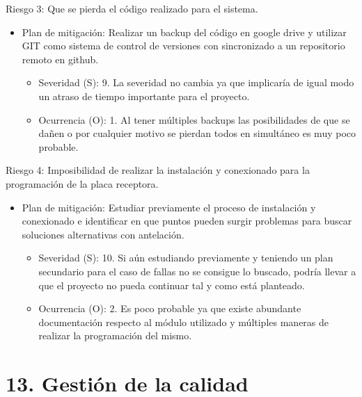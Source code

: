 \documentclass[11pt]{charter}
\begin{document}
Riesgo 3: Que se pierda el código realizado para el sistema.
\begin{itemize}
\item Plan de mitigación: Realizar un backup del código en google drive y utilizar GIT como sistema de control de versiones con sincronizado a un repositorio remoto en github.
	\begin{itemize}
	\item Severidad (S): 9. La severidad no cambia ya que implicaría de igual modo un atraso de tiempo importante para el proyecto.
	\item Ocurrencia (O): 1. Al tener múltiples backups las posibilidades de que se dañen o por cualquier motivo se pierdan todos en simultáneo es muy poco probable.
	\end{itemize}
\end{itemize}
 
Riesgo 4: Imposibilidad de realizar la instalación y conexionado para la programación de la placa receptora.
\begin{itemize}
\item Plan de mitigación: Estudiar previamente el proceso de instalación y conexionado e identificar en que puntos pueden surgir problemas para buscar soluciones alternativas con antelación. 
	\begin{itemize}
	\item Severidad (S): 10. Si aún estudiando previamente y teniendo un plan secundario para el caso de fallas no se consigue lo buscado, podría llevar a que el proyecto no pueda continuar tal y como está planteado.
	\item Ocurrencia (O): 2. Es poco probable ya que existe abundante documentación respecto al módulo utilizado y múltiples maneras de realizar la programación del mismo.
	\end{itemize}
\end{itemize}


\section{13. Gestión de la calidad}
\label{sec:calidad}
\end{document}
